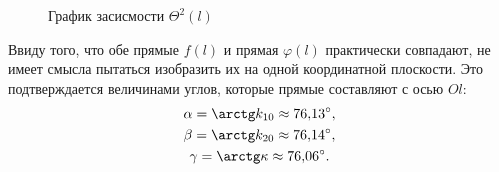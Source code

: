 \begin{figure}[h!]
	\centering
	\caption{График засисмости $\Theta^2(l)$}
\end{figure}

Ввиду того, что обе прямые $f(l)$ и прямая $\varphi(l)$ практически совпадают, не имеет смысла пытаться изобразить их на одной координатной плоскости. Это подтверждается величинами углов, которые прямые составляют с осью $Ol$:
\begin{gather*}
\alpha=\arctg k_{10}\approx76{,}13^\circ, \\
\beta=\arctg k_{20}\approx76{,}14^\circ, \\
\gamma=\arctg\kappa\approx76{,}06^\circ.
\end{gather*}